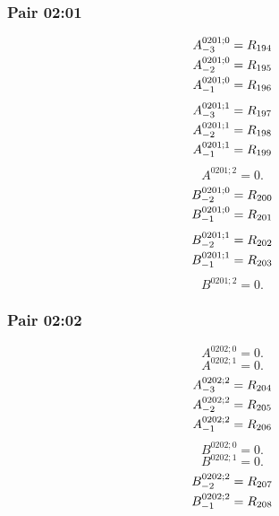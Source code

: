 \documentclass[11pt,a4paper]{article}
\begin{document}
\subsubsection{Pair 02:01}
\begin{equation}
\shortstack[l]{$\displaystyle A^{0201;0}_{-3}=R_{194}$\\
$\displaystyle A^{0201;0}_{-2}=R_{195}$\\
$\displaystyle A^{0201;0}_{-1}=R_{196}$}
\label{eq:cat-map-168}
\end{equation}
\begin{equation}
\shortstack[l]{$\displaystyle A^{0201;1}_{-3}=R_{197}$\\
$\displaystyle A^{0201;1}_{-2}=R_{198}$\\
$\displaystyle A^{0201;1}_{-1}=R_{199}$}
\label{eq:cat-map-169}
\end{equation}
\begin{equation}
A^{0201;2}=0.
\label{eq:cat-map-170}
\end{equation}
\begin{equation}
\shortstack[l]{$\displaystyle B^{0201;0}_{-2}=R_{200}$\\
$\displaystyle B^{0201;0}_{-1}=R_{201}$}
\label{eq:cat-map-171}
\end{equation}
\begin{equation}
\shortstack[l]{$\displaystyle B^{0201;1}_{-2}=R_{202}$\\
$\displaystyle B^{0201;1}_{-1}=R_{203}$}
\label{eq:cat-map-172}
\end{equation}
\begin{equation}
B^{0201;2}=0.
\label{eq:cat-map-173}
\end{equation}
\subsubsection{Pair 02:02}
\begin{equation}
A^{0202;0}=0.
\label{eq:cat-map-174}
\end{equation}
\begin{equation}
A^{0202;1}=0.
\label{eq:cat-map-175}
\end{equation}
\begin{equation}
\shortstack[l]{$\displaystyle A^{0202;2}_{-3}=R_{204}$\\
$\displaystyle A^{0202;2}_{-2}=R_{205}$\\
$\displaystyle A^{0202;2}_{-1}=R_{206}$}
\label{eq:cat-map-176}
\end{equation}
\begin{equation}
B^{0202;0}=0.
\label{eq:cat-map-177}
\end{equation}
\begin{equation}
B^{0202;1}=0.
\label{eq:cat-map-178}
\end{equation}
\begin{equation}
\shortstack[l]{$\displaystyle B^{0202;2}_{-2}=R_{207}$\\
$\displaystyle B^{0202;2}_{-1}=R_{208}$}
\label{eq:cat-map-179}
\end{equation}
\end{document}
